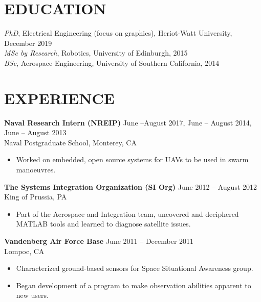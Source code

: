 \documentclass[10pt]{res} %
\begin{document}
\begin{resume}

\section{EDUCATION} 

{\sl PhD}, Electrical Engineering (focus on graphics), Heriot-Watt University, December 2019\\
\emph{MSc by Research}, Robotics, University of Edinburgh, 2015\\ 
\emph{BSc}, Aerospace Engineering, University of Southern California, 2014 


\section{EXPERIENCE}

\textbf{Naval Research Intern (NREIP)} \hfill June --August 2017, June -- August 2014, June -- August 2013 \\
Naval Postgraduate School, Monterey, CA
\begin{itemize} \itemsep -2pt %
\item Worked on embedded, open source systems for UAVs to be used in swarm manoeuvres.  
\end{itemize}
\vspace*{-\baselineskip}

\textbf{The Systems Integration Organization (SI Org)}
\hfill June 2012 -- August 2012 \\
King of Prussia, PA 
\begin{itemize} \itemsep -2pt %
\item Part of the Aerospace and Integration team, uncovered and deciphered MATLAB tools and learned to diagnose satellite issues.
\end{itemize} 
\vspace*{-\baselineskip}

\textbf{Vandenberg Air Force Base} 
\hfill June 2011 -- December 2011 \\ 
Lompoc, CA
\begin{itemize}\itemsep -2pt
\item Characterized ground-based sensors for Space Situational Awareness group.
\item Began development of a program to make observation abilities apparent to new users.
\end{itemize}
\vspace*{-\baselineskip}


\end{resume}
\end{document}
